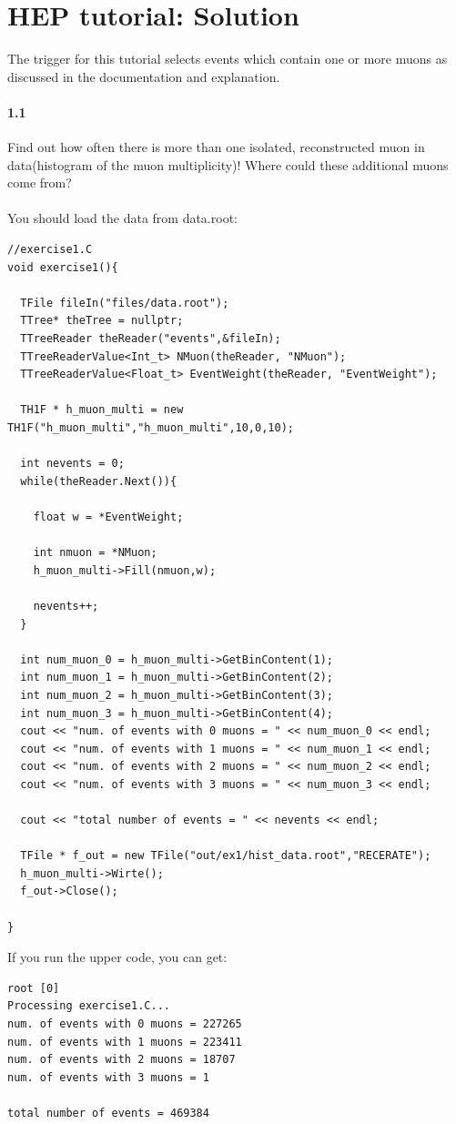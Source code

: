 \documentclass[11pt]{article}
\begin{document}
\section{HEP tutorial: Solution}
The trigger for this tutorial selects events which contain one or more muons as discussed in the documentation and explanation.

\paragraph{1.1}
Find out how often there is more than one isolated, reconstructed muon in data(histogram of the muon multiplicity)! Where could these additional muons come from?\\\\
You should load the data from data.root:
\begin{lstlisting}[emph={if,while,continue,new},emphstyle=\color{nut}]
//exercise1.C
void exercise1(){

  TFile fileIn("files/data.root");
  TTree* theTree = nullptr;
  TTreeReader theReader("events",&fileIn);
  TTreeReaderValue<Int_t> NMuon(theReader, "NMuon");
  TTreeReaderValue<Float_t> EventWeight(theReader, "EventWeight");

  TH1F * h_muon_multi = new TH1F("h_muon_multi","h_muon_multi",10,0,10);

  int nevents = 0;
  while(theReader.Next()){

    float w = *EventWeight;

    int nmuon = *NMuon;
    h_muon_multi->Fill(nmuon,w);

    nevents++;
  }

  int num_muon_0 = h_muon_multi->GetBinContent(1);
  int num_muon_1 = h_muon_multi->GetBinContent(2);
  int num_muon_2 = h_muon_multi->GetBinContent(3);
  int num_muon_3 = h_muon_multi->GetBinContent(4);
  cout << "num. of events with 0 muons = " << num_muon_0 << endl;
  cout << "num. of events with 1 muons = " << num_muon_1 << endl;
  cout << "num. of events with 2 muons = " << num_muon_2 << endl;
  cout << "num. of events with 3 muons = " << num_muon_3 << endl;

  cout << "total number of events = " << nevents << endl;
 
  TFile * f_out = new TFile("out/ex1/hist_data.root","RECERATE");
  h_muon_multi->Wirte();
  f_out->Close();

}
\end{lstlisting}
If you run the upper code, you can get:
\begin{lstlisting}[emph={if,while,continue,new},emphstyle=\color{nut}]
root [0] 
Processing exercise1.C...
num. of events with 0 muons = 227265
num. of events with 1 muons = 223411
num. of events with 2 muons = 18707
num. of events with 3 muons = 1

total number of events = 469384
\end{lstlisting}
\end{document}
